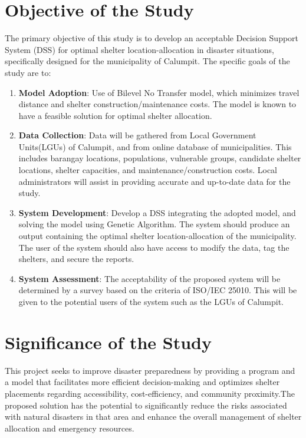 \section{Objective of the Study}
	The primary objective of this study is to develop an acceptable Decision Support System (DSS) for optimal shelter location-allocation in disaster situations, specifically designed for the municipality of Calumpit. The specific goals of the study are to:
	
	\begin{enumerate}
		\item \textbf{Model Adoption}: Use of Bilevel No Transfer model, which minimizes travel distance and shelter construction/maintenance costs. The model is known to have a feasible solution for optimal shelter allocation.

		\item \textbf{Data Collection}: Data will be gathered from Local Government Units(LGUs) of Calumpit, and from online database of municipalities. This includes barangay locations, populations, vulnerable groups, candidate shelter locations, shelter capacities, and maintenance/construction costs. Local administrators will assist in providing accurate and up-to-date data for the study.
		
		\item \textbf{System Development}: Develop a DSS integrating the adopted model, and solving the model using Genetic Algorithm. The system should produce an output containing the optimal shelter location-allocation of the municipality. The user of the system should also have access to modify the data, tag the shelters, and secure the reports.
		
		\item \textbf{System Assessment}: The acceptability of the proposed system will be determined by a survey based on the criteria of ISO/IEC 25010. This will be given to the potential users of the system such as the LGUs of Calumpit.
		
	\end{enumerate}

\section{Significance of the Study}
	This project seeks to improve disaster preparedness by providing a program and a model that facilitates more efficient decision-making and optimizes shelter placements regarding accessibility, cost-efficiency, and community proximity.The proposed solution has the potential to significantly reduce the risks associated with natural disasters in that area and enhance the overall management of shelter allocation and emergency resources.
	
